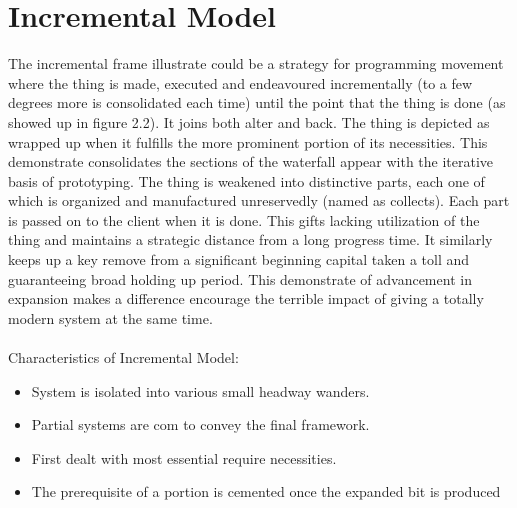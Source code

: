 \documentclass{book}
\begin{document}
    	\section{Incremental Model}
    	
    	The incremental frame illustrate could be a strategy for programming movement where the thing is made, executed and endeavoured incrementally (to a few degrees more is consolidated each time) until the point that the thing is done (as showed up in figure 2.2). It joins both alter and back. The thing is depicted as wrapped up when it fulfills the more prominent portion of its necessities. This demonstrate consolidates the sections of the waterfall appear with the iterative basis of prototyping. The thing is weakened into distinctive parts, each one of which is organized and manufactured unreservedly (named as collects). Each part is passed on to the client when it is done. This gifts lacking utilization of the thing and maintains a strategic distance from a long progress time. It similarly keeps up a key remove from a significant beginning capital taken a toll and guaranteeing broad holding up period. This demonstrate of
    	advancement in expansion makes a difference encourage the terrible impact of giving a totally modern system at the same time.
    	\paragraph{}
    	Characteristics of Incremental Model:
    	\begin{itemize}
    		\item System is isolated into various small headway wanders.
    		\item Partial systems are com to convey the final framework.
    		\item  First dealt with most essential require necessities.
    		\item The prerequisite of a portion is cemented once the expanded bit is produced
    	\end{itemize}
    	
\end{document}

